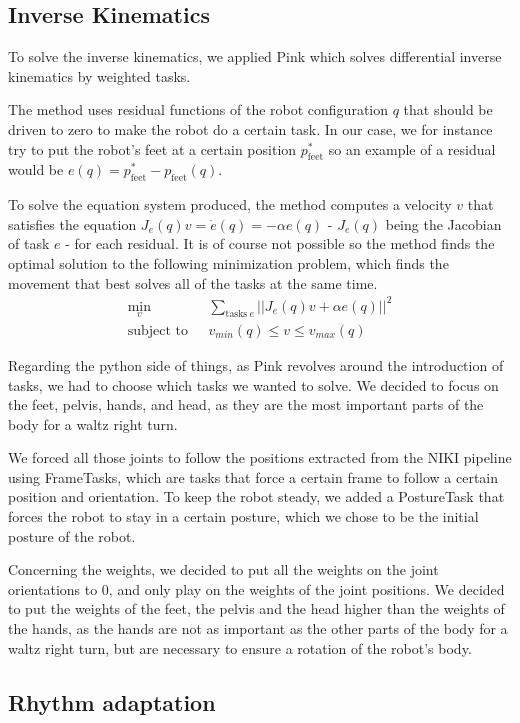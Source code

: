 \documentclass{amsart}
\theoremstyle{definition}
\theoremstyle{plain}
\begin{document}
\subsection{Inverse Kinematics}
To solve the inverse kinematics, we applied Pink\cite{pink2024} which solves differential inverse kinematics by weighted tasks. 

The method uses residual functions of the robot configuration $q$ that should be driven to zero to make the robot do a certain task. In our case, we for instance try to put the robot's feet at a certain position $p_{\text{feet}}^*$ so an example of a residual would be $e(q) = p_{\text{feet}}^* - p_{\text{feet}}(q)$. 

To solve the equation system produced, the method computes a velocity $v$ that satisfies the equation $J_e(q)v = \dot{e}(q) = -\alpha e(q)$ - $J_e(q)$ being the Jacobian of task $e$ - for each residual. 
It is of course not possible so the method finds the optimal solution to the following minimization problem, which finds the movement that best solves all of the tasks at the same time.
$$
\begin{aligned}
\min_v \ \ &\sum_{\text{tasks} \ e} ||J_e(q)v + \alpha e(q)||^2 \\
\text{subject to} \ \ \ &v_{min}(q) \leq v \leq v_{max}(q)
\end{aligned}
$$

Regarding the python side of things, as Pink revolves around the introduction of tasks, we had to choose which tasks we wanted to solve. 
We decided to focus on the feet, pelvis, hands, and head, as they are the most important parts of the body for a waltz right turn. 

We forced all those joints to follow the positions extracted from the NIKI pipeline using FrameTasks, which are tasks that force a certain frame to follow a certain position and orientation. To keep the robot steady, we added a PostureTask that forces the robot to stay in a certain posture, which we chose to be the initial posture of the robot.

Concerning the weights, we decided to put all the weights on the joint orientations to 0, and only play on the weights of the joint positions. We decided to put the weights of the feet, the pelvis and the head higher than the weights of the hands, as the hands are not as important as the other parts of the body for a waltz right turn, but are necessary to ensure a rotation of the robot's body.

\subsection{Rhythm adaptation}
\end{document}
